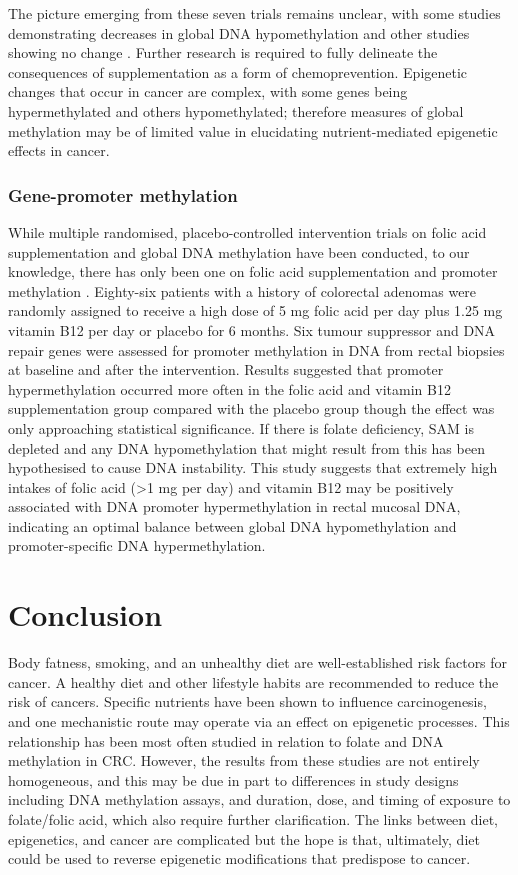 \noindent The picture emerging from these seven trials remains unclear, with some studies demonstrating decreases in global DNA hypomethylation \cite{c254,c256} and other studies showing no change \cite{c251,c252,c257}. Further research is required to fully delineate the consequences of supplementation as a form of chemoprevention. Epigenetic changes that occur in cancer are complex, with some genes being hypermethylated and others hypomethylated; therefore measures of global methylation may be of limited value in elucidating nutrient-mediated epigenetic effects in cancer. 

\subsubsection{Gene-promoter methylation} %
\noindent While multiple randomised, placebo-controlled intervention trials on folic acid supplementation and global DNA methylation have been conducted, to our knowledge, there has only been one on folic acid supplementation and promoter methylation \cite{c258}. Eighty-six patients with a history of colorectal adenomas were randomly assigned to receive a high dose of 5 mg folic acid per day plus 1.25 mg vitamin B12 per day or placebo for 6 months. Six tumour suppressor and DNA repair genes were assessed for promoter methylation in DNA from rectal biopsies at baseline and after the intervention. Results suggested that promoter hypermethylation occurred more often in the folic acid and vitamin B12 supplementation group compared with the placebo group though the effect was only approaching statistical significance. If there is folate deficiency, SAM is depleted and any DNA hypomethylation that might result from this has been hypothesised to cause DNA instability. This study suggests that extremely high intakes of folic acid (>1 mg per day) and vitamin B12 may be positively associated with DNA promoter hypermethylation in rectal mucosal DNA, indicating an optimal balance between global DNA hypomethylation and promoter-specific DNA hypermethylation.

\section{Conclusion} %
\noindent Body fatness, smoking, and an unhealthy diet are well-established risk factors for cancer. A healthy diet and other lifestyle habits are recommended to reduce the risk of cancers. Specific nutrients have been shown to influence carcinogenesis, and one mechanistic route may operate via an effect on epigenetic processes. This relationship has been most often studied in relation to folate and DNA methylation in CRC. However, the results from these studies are not entirely homogeneous, and this may be due in part to differences in study designs including DNA methylation assays, and duration, dose, and timing of exposure to folate/folic acid, which also require further clarification. The links between diet, epigenetics, and cancer are complicated but the hope is that, ultimately, diet could be used to reverse epigenetic modifications that predispose to cancer.

